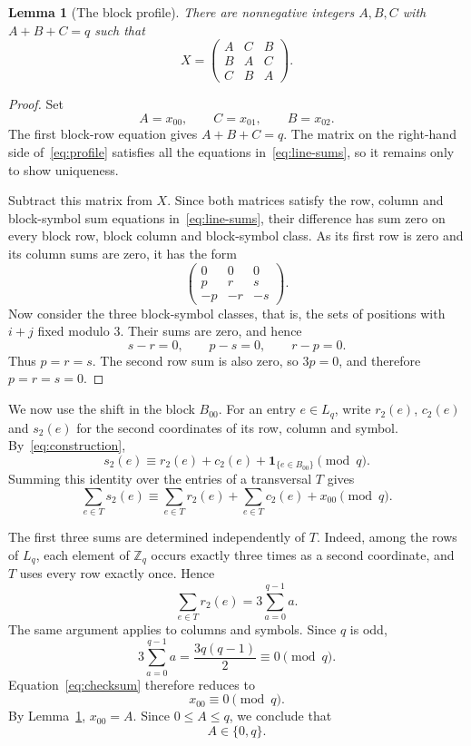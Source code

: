 \documentclass[11pt]{article}
\newtheorem{lemma}[theorem]{Lemma}
\theoremstyle{remark}
\newcommand{\Z}{\mathbb Z}
\newcommand{\1}{\mathbf 1}
\begin{document}
\begin{lemma}[The block profile]\label{lem:profile}
There are nonnegative integers $A,B,C$ with $A+B+C=q$ such that
\begin{equation}\label{eq:profile}
X=
\begin{pmatrix}
 A&C&B\\
 B&A&C\\
 C&B&A
\end{pmatrix}.
\end{equation}
\end{lemma}

\begin{proof}
Set
\[
A=x_{00},\qquad C=x_{01},\qquad B=x_{02}.
\]
The first block-row equation gives $A+B+C=q$. The matrix on the right-hand side of~\eqref{eq:profile} satisfies all the equations in~\eqref{eq:line-sums}, so it remains only to show uniqueness.

Subtract this matrix from $X$. Since both matrices satisfy the row, column and block-symbol sum equations in~\eqref{eq:line-sums}, their difference has sum zero on every block row, block column and block-symbol class. As its first row is zero and its column sums are zero, it has the form
\[
\begin{pmatrix}
0&0&0\\
p&r&s\\
-p&-r&-s
\end{pmatrix}.
\]
Now consider the three block-symbol classes, that is, the sets of positions with $i+j$ fixed modulo $3$. Their sums are zero, and hence
\[
s-r=0,\qquad p-s=0,\qquad r-p=0.
\]
Thus $p=r=s$. The second row sum is also zero, so $3p=0$, and therefore $p=r=s=0$.
\end{proof}

We now use the shift in the block $B_{00}$. For an entry $e\in L_q$, write
$r_2(e)$, $c_2(e)$ and $s_2(e)$ for the second coordinates of its row, column and symbol. By~\eqref{eq:construction},
\[
 s_2(e)
 \equiv
 r_2(e)+c_2(e)
 +\1_{\{e\in B_{00}\}}
 \pmod q.
\]
Summing this identity over the entries of a transversal $T$ gives
\begin{equation}\label{eq:checksum}
 \sum_{e\in T}s_2(e)
 \equiv
 \sum_{e\in T}r_2(e)
 +\sum_{e\in T}c_2(e)
 +x_{00}
 \pmod q.
\end{equation}

The first three sums are determined independently of $T$. Indeed, among the rows of $L_q$, each element of $\Z_q$ occurs exactly three times as a second coordinate, and $T$ uses every row exactly once. Hence
\[
\sum_{e\in T}r_2(e)
=
3\sum_{a=0}^{q-1}a.
\]
The same argument applies to columns and symbols. Since $q$ is odd,
\[
3\sum_{a=0}^{q-1}a
=
\frac{3q(q-1)}2
\equiv0\pmod q.
\]
Equation~\eqref{eq:checksum} therefore reduces to
\[
x_{00}\equiv0\pmod q.
\]
By Lemma~\ref{lem:profile}, $x_{00}=A$. Since $0\leq A\leq q$, we conclude that
\[
A\in\{0,q\}.
\]
\end{document}
